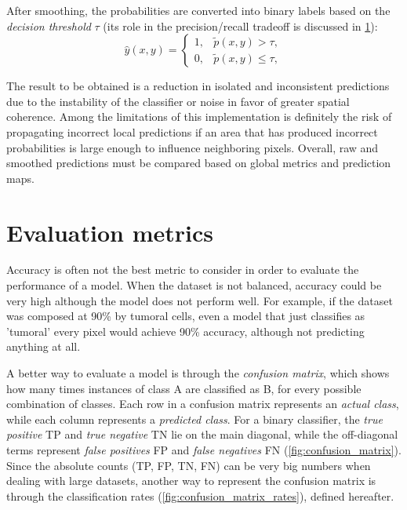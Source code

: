 After smoothing, the probabilities are converted into binary labels based on the \textit{decision threshold} $\tau$ (its role in the precision/recall tradeoff is discussed in \cref{sec:evaluation_metrics}):
\begin{equation}
    \hat{y}(x,y) =
    \begin{cases}
        1, & \tilde{p}(x,y) > \tau,\\
        0, & \tilde{p}(x,y) \leq \tau,
    \end{cases}
    \label{eq:threshold_after_smoothing}
\end{equation}

The result to be obtained is a reduction in isolated and inconsistent predictions due to the instability of the classifier or noise in favor of greater spatial coherence. Among the limitations of this implementation is definitely the risk of propagating incorrect local predictions if an area that has produced incorrect probabilities is large enough to influence neighboring pixels. Overall, raw and smoothed predictions must be compared based on global metrics and prediction maps.

\section{Evaluation metrics}
\label{sec:evaluation_metrics}

Accuracy is often not the best metric to consider in order to evaluate the performance of a model. When the dataset is not balanced, accuracy could be very high although the model does not perform well. For example, if the dataset was composed at 90\% by tumoral cells, even a model that just classifies as 'tumoral' every pixel would achieve 90\% accuracy, although not predicting anything at all.

A better way to evaluate a model is through the \textit{confusion matrix}, which shows how many times instances of class A are classified as B, for every possible combination of classes. Each row in a confusion matrix represents an \textit{actual class}, while each column represents a \textit{predicted class}.
For a binary classifier, the \textit{true positive} TP and \textit{true negative} TN lie on the main diagonal, while the off-diagonal terms represent \textit{false positives} FP and \textit{false negatives} FN (\cref{fig:confusion_matrix}).
Since the absolute counts (TP, FP, TN, FN) can be very big numbers when dealing with large datasets, another way to represent the confusion matrix is through the classification rates (\cref{fig:confusion_matrix_rates}), defined hereafter.


